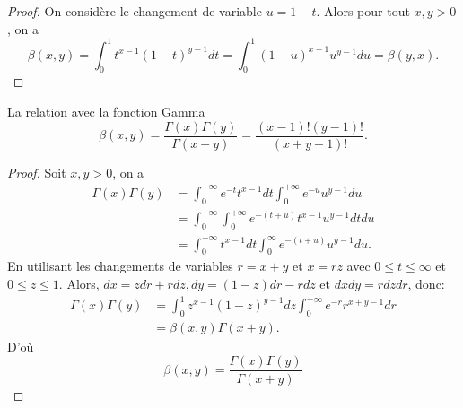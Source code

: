 \begin{proof}
    On considère le changement de variable $u=1-t$. Alors pour tout $x,y>0$, on a 
    \begin{equation*}
        \beta(x,y) = \int_0^1 t^{x-1}(1-t)^{y-1}dt=\int_0^1 (1-u)^{x-1} u^{y-1}du =\beta(y,x).
    \end{equation*}
\end{proof}
\begin{theoreme}
    La relation avec la fonction Gamma\\
    \begin{equation}
        \beta(x,y) = \frac{\Gamma(x)\Gamma(y)}{\Gamma(x+y)} = \frac{(x-1)!(y-1)!}{(x+y-1)!}.
    \end{equation}
\end{theoreme}
\begin{proof}
    Soit $x,y >0$, on a 
    \begin{align*}
        \Gamma(x)\Gamma(y) &= \int_0^{+\infty} e^{-t}t^{x-1}dt\int_0^{+\infty} e^{-u}u^{y-1} du\\
        &= \int_0^{+\infty}\int_0^{+\infty} e^{-(t+u)}t^{x-1}u^{y-1} dtdu \\
        &= \int_0^{+\infty}t^{x-1} dt \int_0^{\infty} e^{-(t+u)}u^{y-1}du.
    \end{align*}
    En utilisant les changements de variables $r=x+y$ et $x=rz$ avec $0\leq t\leq \infty$ et $0\leq z\leq 1$. Alors, $dx=zdr+rdz, dy=(1-z)dr-rdz$ et $dxdy=rdzdr$, donc:
    \begin{align*}
        \Gamma(x)\Gamma(y) &= \int_0^1 z^{x-1}(1-z)^{y-1}dz\int_0^{+\infty} e^{-r}r^{x+y-1}dr \\
        &= \beta(x,y)\Gamma(x+y).
    \end{align*}
    D'où 
    \begin{equation*}
        \beta(x,y)=\frac{\Gamma(x)\Gamma(y)}{\Gamma(x+y)}
    \end{equation*}
\end{proof}
